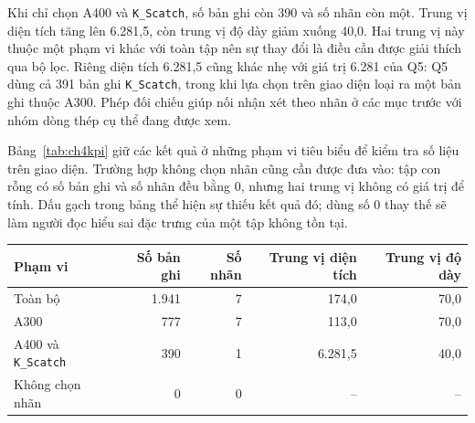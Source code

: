 \documentclass[12pt,a4paper,oneside]{report}
\newcommand{\maCot}[1]{{\urlstyle{tt}\def\UrlBreaks{\do\_\do\/\do\.}\def\UrlBigBreaks{}\nolinkurl{#1}}}
\begin{document}
\begin{center}\begin{minipage}{\linewidth}
\centering
{}
\label{fig:ch4dashboardall}
\end{minipage}\end{center}

Khi chỉ chọn A400 và \maCot{K_Scatch}, số bản ghi còn 390 và số nhãn còn một. Trung vị diện tích tăng lên 6.281,5, còn trung vị độ dày giảm xuống 40,0. Hai trung vị này thuộc một phạm vi khác với toàn tập nên sự thay đổi là điều cần được giải thích qua bộ lọc. Riêng diện tích 6.281,5 cũng khác nhẹ với giá trị 6.281 của Q5: Q5 dùng cả 391 bản ghi \maCot{K_Scatch}, trong khi lựa chọn trên giao diện loại ra một bản ghi thuộc A300. Phép đối chiếu giúp nối nhận xét theo nhãn ở các mục trước với nhóm dòng thép cụ thể đang được xem.

\begin{center}\begin{minipage}{\linewidth}
\centering
{}
\label{fig:ch4dashboardfilter}
\end{minipage}\end{center}

Bảng~\ref{tab:ch4kpi} giữ các kết quả ở những phạm vi tiêu biểu để kiểm tra số liệu trên giao diện. Trường hợp không chọn nhãn cũng cần được đưa vào: tập con rỗng có số bản ghi và số nhãn đều bằng 0, nhưng hai trung vị không có giá trị để tính. Dấu gạch trong bảng thể hiện sự thiếu kết quả đó; dùng số 0 thay thế sẽ làm người đọc hiểu sai đặc trưng của một tập không tồn tại.

\begin{center}\begin{minipage}{\linewidth}
\label{tab:ch4kpi}
\small{}
\begin{tabularx}{\linewidth}{@{}Y r r r r@{}}
\toprule
Phạm vi & Số bản ghi & Số nhãn & Trung vị diện tích & Trung vị độ dày \\
\midrule
Toàn bộ & 1.941 & 7 & 174,0 & 70,0 \\
A300 & 777 & 7 & 113,0 & 70,0 \\
A400 và \maCot{K_Scatch} & 390 & 1 & 6.281,5 & 40,0 \\
Không chọn nhãn & 0 & 0 & -- & -- \\
\bottomrule
\end{tabularx}
\end{minipage}\end{center}
\end{document}
